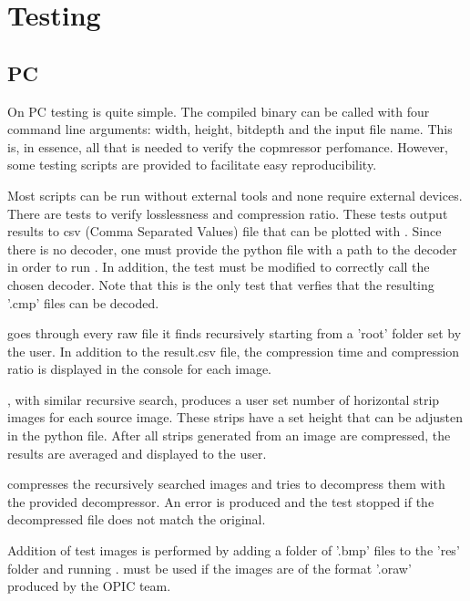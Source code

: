 \documentclass[12pt, a4paper]{article}
\begin{document}
\newpage
\section{Testing}
\subsection{PC}

On PC testing is quite simple. 
The compiled binary  can be called with four command line arguments: 
width, height, bitdepth and the input file name. 
This is, in essence, all that is needed to verify the copmressor perfomance. 
However, some testing scripts are provided to facilitate easy reproducibility. 

\medskip
\noindent
Most scripts can be run without external tools and none require external devices.
There are tests to verify losslessness and compression ratio. 
These tests output results to csv (Comma Separated Values) file that can be plotted with . 
Since there is no decoder, 
one must provide the python file with a path to the decoder in order to run . 
In addition, the test must be modified to correctly call the chosen decoder.
Note that this is the only test that verfies that the resulting '.cmp' files can be decoded. 

\medskip
\noindent
{} goes through every raw file it finds recursively starting from a 'root' folder set by the user.
In addition to the result.csv file, the compression time and compression ratio is displayed in the console for each image.

\medskip
\noindent
{}, with similar recursive search, produces a user set number of horizontal strip images for each source image. 
These strips have a set height that can be adjusten in the python file. 
After all strips generated from an image are compressed, the results are averaged and displayed to the user. 

\medskip
\noindent
{} compresses the recursively searched images and tries to decompress them with the provided decompressor.
An error is produced and the test stopped if the decompressed file does not match the original.

\medskip
\noindent
Addition of test images is performed by adding a folder of '.bmp' files to the 'res' folder and running . 
 must be used if the images are of the format '.oraw' produced by the OPIC team. 
\end{document}
